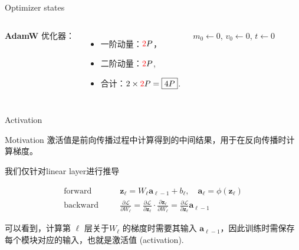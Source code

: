\documentclass[aspectratio=169]{beamer}
\newcommand{\redtwo}{\textcolor{red}{2}}
\begin{document}
\begin{frame}{Optimizer states}

    \begin{columns}
        \textbf{AdamW} 优化器：
      \begin{itemize}
        \item 一阶动量：$\redtwo P$，
        \item 二阶动量：$\redtwo P$,
        \item 合计：$2\times \redtwo P = \boxed{4P}$.
      \end{itemize}

      \begin{algorithm}[H]
        \KwIn{$\alpha$, $\lambda$, $\beta_1, \beta_2 \in [0,1)$, $\epsilon$, $\theta_0$}
        
        $m_0 \leftarrow 0$, $v_0 \leftarrow 0$, $t \leftarrow 0$\;
        
        \caption{AdamW\cite{loshchilov2019decoupledweightdecayregularization}}
      \end{algorithm}
  \end{columns}
\end{frame}

\begin{frame}{Activation}
  \begin{block}{Motivation}
      激活值是前向传播过程中计算得到的中间结果，用于在反向传播时计算梯度。
  \end{block}
  
  我们仅针对linear layer进行推导

  \begin{align*}
    \text{forward}&\quad &\mathbf{z}_\ell = W_\ell\mathbf{a}_{\ell-1}+b_\ell,\quad \mathbf{a}_{\ell} = \phi(\mathbf{z}_\ell) \\
    \text{backward}&\quad&\frac{\partial \mathcal{L}}{\partial W_\ell}
    = \frac{\partial \mathcal{L}}{\partial \mathbf{z}_\ell}\cdot
    \frac{\partial \mathbf{z}_\ell}{\partial W_\ell}
    = \frac{\partial \mathcal{L}}{\partial \mathbf{z}_\ell} \boxed{\mathbf{a}_{\ell-1}}
  \end{align*}

  可以看到，计算第 $\ell$ 层关于$W_{\ell}$ 的梯度时需要其输入 $\mathbf{a}_{\ell-1}$，因此训练时需保存每个模块对应的输入，也就是激活值 (activation).
\end{frame}
\end{document}
